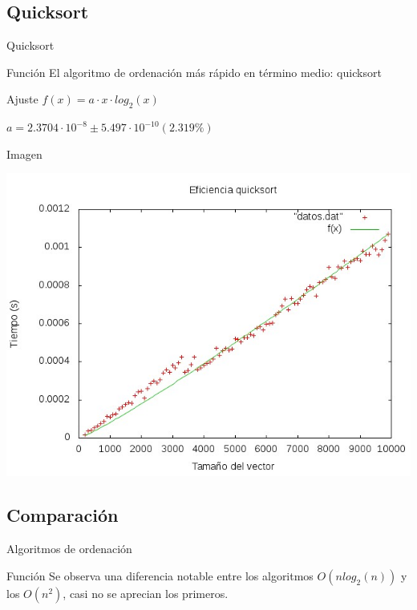 \documentclass[compress]{beamer}
\begin{document}
\subsection{Quicksort}
\begin{frame}{Quicksort}
	\begin{block}{Función}
	El algoritmo de ordenación más rápido en término medio: quicksort
	\end{block}
	
	\begin{block}{Ajuste}
	$f(x) = a\cdot x\cdot log_2(x)$

	$a               = 2.3704\cdot 10^{-8}       \pm 5.497\cdot 10^{-10}    (2.319\%) $
	\end{block}
\end{frame}
\begin{frame}
	\begin{alertblock}{Imagen}
	\begin{center}
	\includegraphics[scale=0.55]{../Graficas/Quicksort/quicksortO0_bruno.jpeg}					\end{center}	
	\end{alertblock}
\end{frame}


\subsection{Comparación}
\begin{frame}{Algoritmos de ordenación}
	\begin{block}{Función}
	Se observa una diferencia notable entre los algoritmos $O(nlog_2(n))$ y los
	$O(n^2)$, casi no se aprecian los primeros.
	\end{block}
\end{frame}
\end{document}
